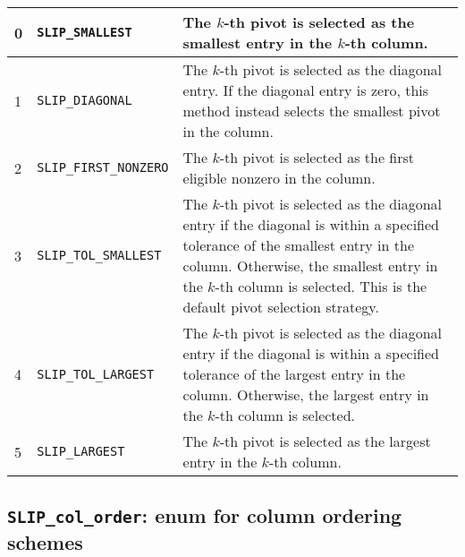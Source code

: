 \documentclass[12pt]{article}
\theoremstyle{definition}
\begin{document}
{\small
\begin{center}
\begin{tabular}{llp{4in}}
\hline
0 & \verb|SLIP_SMALLEST|        & The $k$-th pivot is selected as the smallest
                                  entry in the $k$-th column.\\
\hline
1 & \verb|SLIP_DIAGONAL|        & The $k$-th pivot is selected as the diagonal
                                  entry. If the diagonal entry is zero,
                                  this method instead selects the smallest
                                  pivot in the column.\\
\hline
2 & \verb|SLIP_FIRST_NONZERO|   & The $k$-th pivot is selected as the first
                                  eligible nonzero in the column. \\
\hline
3 & \verb|SLIP_TOL_SMALLEST|    & The $k$-th pivot is selected as the diagonal
                                  entry if the diagonal is within a
                                  specified tolerance of the smallest entry in
                                  the column. Otherwise, the smallest
                                  entry in the $k$-th column is selected.
                                  This is the default pivot selection
                                  strategy. \\
\hline
4 & \verb|SLIP_TOL_LARGEST|     & The $k$-th pivot is selected as the diagonal
                                  entry if the diagonal is within a
                                  specified tolerance of the largest entry in
                                  the column.  Otherwise, the largest
                                  entry in the $k$-th column is selected. \\
\hline
5 & \verb|SLIP_LARGEST|         & The $k$-th pivot is selected as the largest
                                  entry in the $k$-th column. \\
\hline
\end{tabular}
\end{center}
}

\cprotect\subsection{\verb|SLIP_col_order|: enum for column ordering schemes}
\label{ss:SLIP_col_order}
\end{document}
